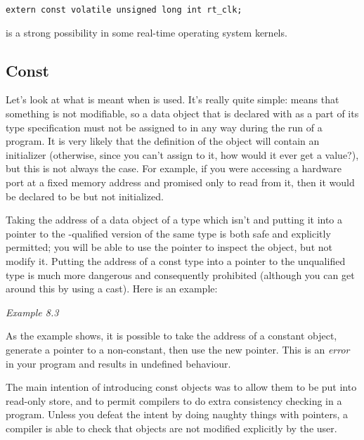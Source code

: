 \begin{Verbatim}
extern const volatile unsigned long int rt_clk;
\end{Verbatim}

  is a strong possibility in some real-time operating system kernels.


  \subsection{Const}
   

   Let's look at what is meant when \const{} is used. It's
    really quite simple: \const{} means that something is not
    modifiable, so a data object that is declared with \const{} as
    a part of its type specification must not be assigned to in any way
    during the run of a program. It is very likely that the definition of
    the object will contain an initializer (otherwise, since you can't
    assign to it, how would it ever get a value?), but this is not always
    the case. For example, if you were accessing a hardware port at a fixed
    memory address and promised only to read from it, then it would be
    declared to be \const{} but not initialized.


   Taking the address of a data object of a type which isn't
    \const{} and putting it into a pointer to the
    \const-qualified version of the same type is both safe and
    explicitly permitted; you will be able to use the pointer to inspect the
    object, but not modify it. Putting the address of a const type into
    a pointer to the unqualified type is much more dangerous and
    consequently prohibited (although you can get around this by using
    a cast). Here is an example:


    \begin{center}\textit{Example 8.3}\end{center}


   As the example shows, it is possible to take the address of a constant
    object, generate a pointer to a non-constant, then use the new pointer.
    This is an \textit{error} in your program and results in undefined
    behaviour.


   The main intention of introducing const objects was to allow them to
    be put into read-only store, and to permit compilers to do extra
    consistency checking in a program. Unless you defeat the intent by doing
    naughty things with pointers, a compiler is able to check that
    \const{} objects are not modified explicitly by the user.


